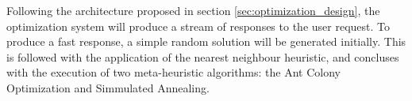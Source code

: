 Following the architecture proposed in section \ref{sec:optimization_design},
the optimization system will produce a stream of responses to the user request.
To produce a fast response, a simple random solution will be generated initially.
This is followed with the application of the nearest neighbour heuristic,
and concluses with the execution of two meta-heuristic algorithms: the Ant Colony Optimization
and Simmulated Annealing.
